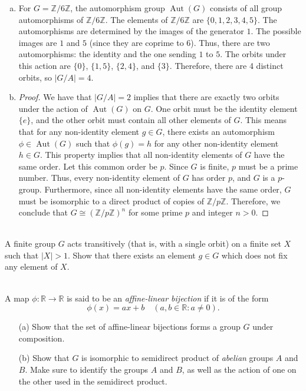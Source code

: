 \documentclass{article}
\def\zz{{\mathbb Z}}
\def\rr{{\mathbb R}}
\begin{document}
\begin{enumerate}[(a)]
    \item For $G = \zz/6\zz$, the automorphism group $\operatorname{Aut}(G)$ consists of all group automorphisms of $\zz/6\zz$. The elements of $\zz/6\zz$ are $\{0, 1, 2, 3, 4, 5\}$. The automorphisms are determined by the images of the generator $1$. The possible images are $1$ and $5$ (since they are coprime to $6$). Thus, there are two automorphisms: the identity and the one sending $1$ to $5$. The orbits under this action are $\{0\}$, $\{1, 5\}$, $\{2, 4\}$, and $\{3\}$. Therefore, there are 4 distinct orbits, so $|G/A| = 4$.
    \item \begin{proof}
        We have that $|G/A| = 2$ implies that there are exactly two orbits under the action of $\operatorname{Aut}(G)$ on $G$. One orbit must be the identity element $\{e\}$, and the other orbit must contain all other elements of $G$. This means that for any non-identity element $g \in G$, there exists an automorphism $\phi \in \operatorname{Aut}(G)$ such that $\phi(g) = h$ for any other non-identity element $h \in G$. This property implies that all non-identity elements of $G$ have the same order. Let this common order be $p$. Since $G$ is finite, $p$ must be a prime number. Thus, every non-identity element of $G$ has order $p$, and $G$ is a $p$-group. Furthermore, since all non-identity elements have the same order, $G$ must be isomorphic to a direct product of copies of $\zz/p\zz$. Therefore, we conclude that $G \cong (\zz/p\zz)^n$ for some prime $p$ and integer $n > 0$.
    \end{proof}
\end{enumerate}




\begin{problem} \\
    A finite group $G$ acts transitively (that is, with a single orbit) on a finite set $X$ such that $|X| > 1$. Show that there exists an element $g \in G$ which does not fix any element of $X$.
\end{problem}



\begin{problem} \\
    A map $\phi : \rr \to \rr$ is said to be an \textit{affine-linear bijection} if it is of the form 
    \[
        \phi(x) = ax + b \quad (a,b \in \rr : a \neq 0).
    \]
    \begin{enumerate}
        \item[(a)] Show that the set of affine-linear bijections forms a group $G$ under composition. %
        \item[(b)] Show that $G$ is isomorphic to semidirect product of \textit{abelian} groups $A$ and $B$. Make sure to identify the groups $A$ and $B$, as well as the action of one on the other used in the semidirect product. %
    \end{enumerate}
\end{problem}
\end{document}
